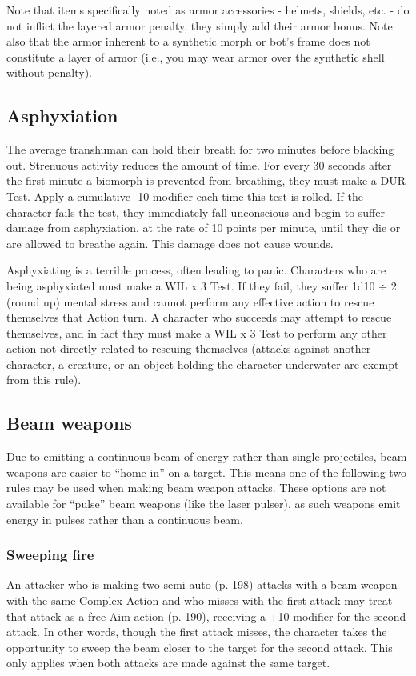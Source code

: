 Note that items specifically noted as armor accessories -  helmets, shields, etc. - do not inflict the layered armor penalty, they simply add their armor bonus. Note also that the armor inherent to a synthetic morph or bot’s frame does not constitute a layer of armor (i.e., you may wear armor over the synthetic shell without penalty).


\subsection{Asphyxiation}
\label{sec:asphyxiation}

The average transhuman can hold their breath for two minutes before blacking out. Strenuous activity reduces the amount of time. For every 30 seconds after the first minute a biomorph is prevented from breathing, they must make a DUR Test. Apply a cumulative -10 modifier each time this test is rolled. If the character fails the test, they immediately fall unconscious and begin to suffer damage from asphyxiation, at the rate of 10 points per minute, until they die or are allowed to breathe again. This damage does not cause wounds.

Asphyxiating is a terrible process, often leading to panic. Characters who are being asphyxiated must make a WIL x 3 Test. If they fail, they suffer 1d10 $\div$ 2 (round up) mental stress and cannot perform any effective action to rescue themselves that Action turn. A character who succeeds may attempt to rescue themselves, and in fact they must make a WIL x 3 Test to perform any other action not directly related to rescuing themselves (attacks against another character, a creature, or an object holding the character underwater are exempt from this rule).


\subsection{Beam weapons}
\label{sec:beam-weapons}

Due to emitting a continuous beam of energy rather than single projectiles, beam weapons are easier to ``home in'' on a target. This means one of the following two rules may be used when making beam weapon attacks. These options are not available for ``pulse'' beam weapons (like the laser pulser), as such weapons emit energy in pulses rather than a continuous beam.

\subsubsection{Sweeping fire}
An attacker who is making two semi-auto (p. 198) attacks with a beam weapon with the same Complex Action and who misses with the first attack may treat that attack as a free Aim action (p. 190), receiving a +10 modifier for the second attack. In other words, though the first attack misses, the character takes the opportunity to sweep the beam closer to the target for the second attack. This only applies when both attacks are made against the same target.

